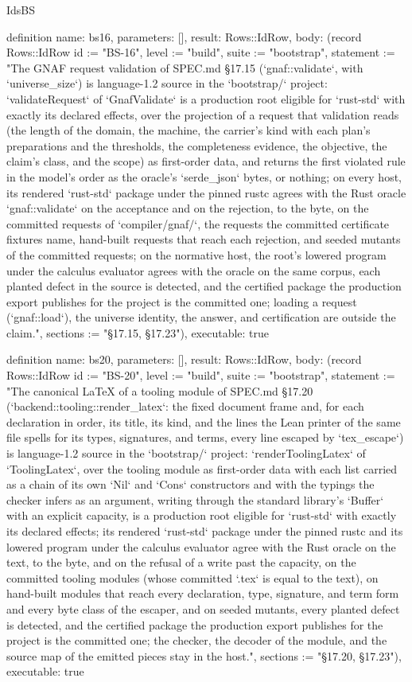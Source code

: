 \begin{lexlean}{IdsBS}
\begin{semanticmodule}
definition{
  name: bs16,
  parameters: [],
  result: Rows::IdRow,
  body: (record Rows::IdRow {id := "BS-16", level := "build", suite := "bootstrap", statement := "The GNAF request validation of SPEC.md §17.15 (`gnaf::validate`, with `universe_size`) is language-1.2 source in the `bootstrap/` project: `validateRequest` of `GnafValidate` is a production root eligible for `rust-std` with exactly its declared effects, over the projection of a request that validation reads (the length of the domain, the machine, the carrier's kind with each plan's preparations and the thresholds, the completeness evidence, the objective, the claim's class, and the scope) as first-order data, and returns the first violated rule in the model's order as the oracle's `serde_json` bytes, or nothing; on every host, its rendered `rust-std` package under the pinned rustc agrees with the Rust oracle `gnaf::validate` on the acceptance and on the rejection, to the byte, on the committed requests of `compiler/gnaf/`, the requests the committed certificate fixtures name, hand-built requests that reach each rejection, and seeded mutants of the committed requests; on the normative host, the root's lowered program under the calculus evaluator agrees with the oracle on the same corpus, each planted defect in the source is detected, and the certified package the production export publishes for the project is the committed one; loading a request (`gnaf::load`), the universe identity, the answer, and certification are outside the claim.", sections := "§17.15, §17.23"}),
  executable: true
}

definition{
  name: bs20,
  parameters: [],
  result: Rows::IdRow,
  body: (record Rows::IdRow {id := "BS-20", level := "build", suite := "bootstrap", statement := "The canonical LaTeX of a tooling module of SPEC.md §17.20 (`backend::tooling::render_latex`: the fixed document frame and, for each declaration in order, its title, its kind, and the lines the Lean printer of the same file spells for its types, signatures, and terms, every line escaped by `tex_escape`) is language-1.2 source in the `bootstrap/` project: `renderToolingLatex` of `ToolingLatex`, over the tooling module as first-order data with each list carried as a chain of its own `Nil` and `Cons` constructors and with the typings the checker infers as an argument, writing through the standard library's `Buffer` with an explicit capacity, is a production root eligible for `rust-std` with exactly its declared effects; its rendered `rust-std` package under the pinned rustc and its lowered program under the calculus evaluator agree with the Rust oracle on the text, to the byte, and on the refusal of a write past the capacity, on the committed tooling modules (whose committed `.tex` is equal to the text), on hand-built modules that reach every declaration, type, signature, and term form and every byte class of the escaper, and on seeded mutants, every planted defect is detected, and the certified package the production export publishes for the project is the committed one; the checker, the decoder of the module, and the source map of the emitted pieces stay in the host.", sections := "§17.20, §17.23"}),
  executable: true
}


\end{semanticmodule}
\end{lexlean}

